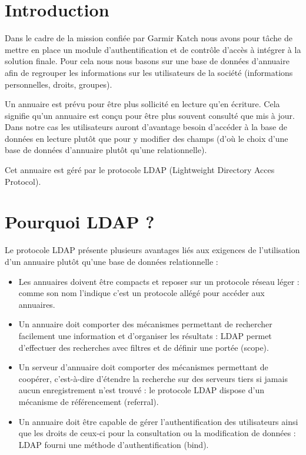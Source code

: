 \documentclass[11pt,fleqn]{report}
\begin{document}
    
\ZMakeCover


\ZMakeTableOfContents

\chapter{Introduction}
Dans le cadre de la mission confiée par Garmir Katch nous avons pour tâche de mettre en place un module d’authentification et de contrôle d’accès à intégrer à la solution finale. Pour cela nous nous basons sur une base de données d’annuaire afin de regrouper les informations sur les utilisateurs de la société (informations personnelles, droits, groupes).

Un annuaire est prévu pour être plus sollicité en lecture qu'en écriture. Cela signifie qu'un annuaire est conçu pour être plus souvent consulté que mis à jour. Dans notre cas les utilisateurs auront d’avantage besoin d’accéder à la base de données en lecture plutôt que pour y modifier des champs (d’où le choix d’une base de données d’annuaire plutôt qu’une relationnelle).

Cet annuaire est géré par le protocole LDAP (Lightweight Directory Acces Protocol).
\chapter{Pourquoi LDAP ?}
Le protocole LDAP présente plusieurs avantages liés aux exigences de l’utilisation d’un annuaire plutôt qu’une base de données relationnelle :
\begin{itemize}
\item Les annuaires doivent être compacts et reposer sur un protocole réseau léger : comme son nom l’indique c’est un protocole allégé pour accéder aux annuaires.
\item Un annuaire doit comporter des mécanismes permettant de rechercher facilement une information et d'organiser les résultats : LDAP permet d’effectuer des recherches avec filtres et de définir une portée (scope).
\item Un serveur d'annuaire doit comporter des mécanismes permettant de coopérer, c'est-à-dire d'étendre la recherche sur des serveurs tiers si jamais aucun enregistrement n'est trouvé : le protocole LDAP dispose d’un mécanisme de référencement (referral).
\item Un annuaire doit être capable de gérer l'authentification des utilisateurs ainsi que les droits de ceux-ci pour la consultation ou la modification de données : LDAP fourni une méthode d’authentification (bind).
\end{itemize}
\end{document}
